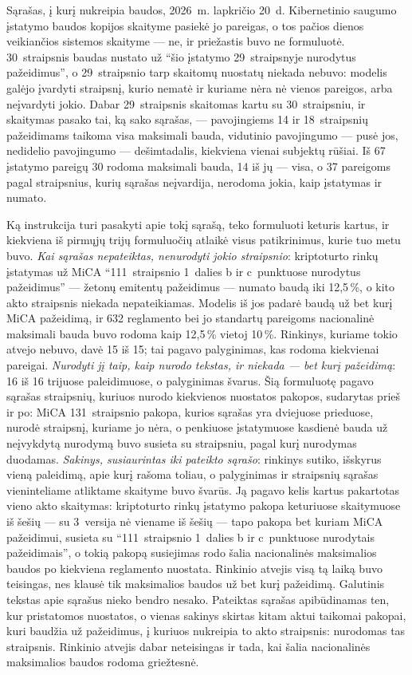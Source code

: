 \begin{lessonbox}{Sąrašas, į kurį nukreipia baudos, 2026~m. lapkričio 20~d.}
Kibernetinio saugumo įstatymo baudos kopijos skaityme pasiekė jo pareigas, o tos pačios dienos
veikiančios sistemos skaityme --- ne, ir priežastis buvo ne formuluotė. 30~straipsnis baudas
nustato už \enquote{šio įstatymo 29~straipsnyje nurodytus pažeidimus}, o 29~straipsnio tarp
skaitomų nuostatų niekada nebuvo: modelis galėjo įvardyti straipsnį, kurio nematė ir kuriame
nėra nė vienos pareigos, arba neįvardyti jokio. Dabar 29~straipsnis skaitomas kartu su
30~straipsniu, ir skaitymas pasako tai, ką sako sąrašas, --- pavojingiems 14 ir 18~straipsnių
pažeidimams taikoma visa maksimali bauda, vidutinio pavojingumo --- pusė jos, nedidelio
pavojingumo --- dešimtadalis, kiekviena vienai subjektų rūšiai. Iš 67 įstatymo pareigų 30
rodoma maksimali bauda, 14 iš jų --- visa, o 37 pareigoms pagal straipsnius, kurių sąrašas
neįvardija, nerodoma jokia, kaip įstatymas ir numato.

Ką instrukcija turi pasakyti apie tokį sąrašą, teko formuluoti keturis kartus, ir kiekviena iš
pirmųjų trijų formuluočių atlaikė visus patikrinimus, kurie tuo metu buvo. \emph{Kai sąrašas
nepateiktas, nenurodyti jokio straipsnio}: kriptoturto rinkų įstatymas už MiCA
\enquote{111~straipsnio 1~dalies b ir c~punktuose nurodytus pažeidimus} --- žetonų emitentų
pažeidimus --- numato baudą iki 12,5\,\%, o kito akto straipsnis niekada nepateikiamas. Modelis
iš jos padarė baudą už bet kurį MiCA pažeidimą, ir 632 reglamento bei jo standartų pareigoms
nacionalinė maksimali bauda buvo rodoma kaip 12,5\,\% vietoj 10\,\%. Rinkinys, kuriame tokio
atvejo nebuvo, davė 15 iš 15; tai pagavo palyginimas, kas rodoma kiekvienai pareigai.
\emph{Nurodyti jį taip, kaip nurodo tekstas, ir niekada --- bet kurį pažeidimą}: 16 iš 16
trijuose paleidimuose, o palyginimas švarus. Šią formuluotę pagavo sąrašas straipsnių, kuriuos
nurodo kiekvienos nuostatos pakopos, sudarytas prieš ir po: MiCA 131~straipsnio pakopa, kurios
sąrašas yra dviejuose prieduose, nurodė straipsnį, kuriame jo nėra, o penkiuose įstatymuose
kasdienė bauda už neįvykdytą nurodymą buvo susieta su straipsniu, pagal kurį nurodymas
duodamas. \emph{Sakinys, susiaurintas iki pateikto sąrašo}: rinkinys sutiko, išskyrus vieną
paleidimą, apie kurį rašoma toliau, o palyginimas ir straipsnių sąrašas vieninteliame
atliktame skaityme buvo švarūs. Ją pagavo kelis kartus pakartotas vieno akto skaitymas:
kriptoturto rinkų įstatymo pakopa keturiuose skaitymuose iš šešių --- su 3~versija nė viename
iš šešių --- tapo pakopa bet kuriam MiCA pažeidimui, susieta su \enquote{111~straipsnio
1~dalies b ir c~punktuose nurodytais pažeidimais}, o tokią pakopą susiejimas rodo šalia
nacionalinės maksimalios baudos po kiekviena reglamento nuostata. Rinkinio atvejis visą tą
laiką buvo teisingas, nes klausė tik maksimalios baudos už bet kurį pažeidimą. Galutinis
tekstas apie sąrašus nieko bendro nesako. Pateiktas sąrašas apibūdinamas ten, kur pristatomos
nuostatos, o vienas sakinys skirtas kitam aktui taikomai pakopai, kuri baudžia už pažeidimus,
į kuriuos nukreipia to akto straipsnis: nurodomas tas straipsnis. Rinkinio atvejis dabar
neteisingas ir tada, kai šalia nacionalinės maksimalios baudos rodoma griežtesnė.


\end{lessonbox}
